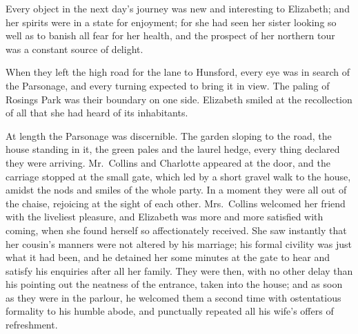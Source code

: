 
Every object in the next day’s journey was new and
interesting to Elizabeth; and her spirits were in a state
for enjoyment; for she had seen her sister looking so well
as to banish all fear for her health, and the prospect of her
northern tour was a constant source of delight.

When they left the high road for the lane to Hunsford,
every eye was in search of the Parsonage, and every
turning expected to bring it in view. The paling of Rosings
Park was their boundary on one side. Elizabeth smiled
at the recollection of all that she had heard of its
inhabitants.

At length the Parsonage was discernible. The garden
sloping to the road, the house standing in it, the green
pales and the laurel hedge, every thing declared they
were arriving. Mr.\ Collins and Charlotte appeared at the
door, and the carriage stopped at the small gate, which
led by a short gravel walk to the house, amidst the nods
and smiles of the whole party. In a moment they were
all out of the chaise, rejoicing at the sight of each other.
Mrs.\ Collins welcomed her friend with the liveliest pleasure,
and Elizabeth was more and more satisfied with coming,
when she found herself so affectionately received. She
saw instantly that her cousin’s manners were not altered
by his marriage; his formal civility was just what it had
been, and he detained her some minutes at the gate to
hear and satisfy his enquiries after all her family. They
were then, with no other delay than his pointing out the
neatness of the entrance, taken into the house; and as
soon as they were in the parlour, he welcomed them a
second time with ostentatious formality to his humble
abode, and punctually repeated all his wife’s offers of
refreshment.


